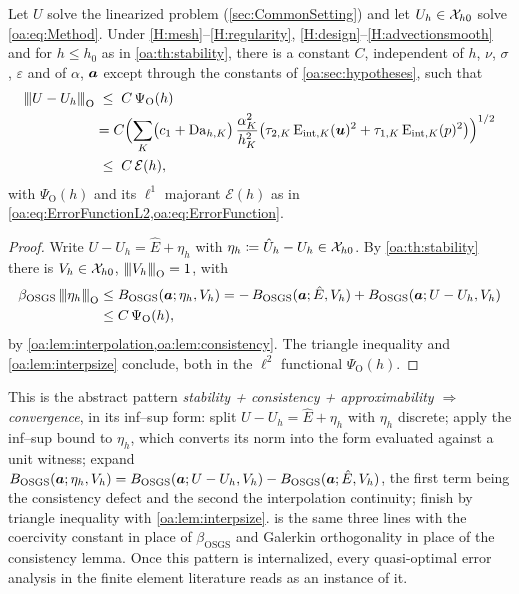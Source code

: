 \begin{theorem}
\label{oa:th:convergence}
Let $U$ solve the linearized problem (\cref{sec:CommonSetting}) and let
$U_h \in \mathcal{X}_{h0}$ solve \cref{oa:eq:Method}. Under \cref{H:mesh}--\cref{H:regularity}, \cref{H:design}--\cref{H:advectionsmooth} and for
$h \le h_0$ as in \cref{oa:th:stability}, there is a constant $C$, independent of $h$,
$\nu$, $\sigma$, $\varepsilon$ and of $\alpha$, $\boldsymbol{a}$ except through the constants of
\cref{oa:sec:hypotheses}, such that
\begin{equation}
  \label{oa:eq:MainResult}
\begin{aligned}
  {\lvert\kern-0.25ex\lvert\kern-0.25ex\lvert U - U_h \rvert\kern-0.25ex\rvert\kern-0.25ex\rvert}_{\mathrm{O}}
  &\;\le\;
  C\,\Psi_{\mathrm O}(h) \\
  &= C\Bigl( \sum_K \bigl( c_1 + \mathrm{Da}_{h,K} \bigr)\,\frac{\alpha_K^2}{h_K^2}
  \bigl( \tau_{2,K}\,\mathrm{E}_{\mathrm{int},K}(\boldsymbol{u})^2 + \tau_{1,K}\,\mathrm{E}_{\mathrm{int},K}(p)^2 \bigr) \Bigr)^{1/2} \\
  &\;\le\; C\,\mathcal{E}(h),
\end{aligned}
\end{equation}
with $\Psi_{\mathrm O}(h)$ and its $\ell^1$ majorant $\mathcal{E}(h)$ as in
\cref{oa:eq:ErrorFunctionL2,oa:eq:ErrorFunction}.
\end{theorem}

\begin{proof}
Write $U - U_h = \hat E + \eta_h$ with $\eta_h \coloneqq \hat U_h - U_h \in \mathcal{X}_{h0}$.
By \cref{oa:th:stability} there is $V_h \in \mathcal{X}_{h0}$, ${\lvert\kern-0.25ex\lvert\kern-0.25ex\lvert V_h \rvert\kern-0.25ex\rvert\kern-0.25ex\rvert}_{\mathrm{O}} = 1$, with
\[
\begin{aligned}
  \beta_{\mathrm{OSGS}}\,{\lvert\kern-0.25ex\lvert\kern-0.25ex\lvert \eta_h \rvert\kern-0.25ex\rvert\kern-0.25ex\rvert}_{\mathrm{O}}
  &\le B_{\mathrm{OSGS}}(\boldsymbol{a}; \eta_h, V_h)
  = -\,B_{\mathrm{OSGS}}(\boldsymbol{a}; \hat E, V_h)
  + B_{\mathrm{OSGS}}(\boldsymbol{a}; U - U_h, V_h) \\
  &\le C\,\Psi_{\mathrm O}(h),
\end{aligned}
\]
by \cref{oa:lem:interpolation,oa:lem:consistency}. The triangle inequality and
\cref{oa:lem:interpsize} conclude, both in the $\ell^2$ functional $\Psi_{\mathrm O}(h)$.
\end{proof}

\begin{pedagogy}
This is the abstract pattern \emph{stability + consistency + approximability
$\Rightarrow$ convergence}, in its inf--sup form: split $U - U_h = \hat E +
\eta_h$ with $\eta_h$ discrete; apply the inf--sup bound to $\eta_h$, which
converts its norm into the form evaluated against a unit witness; expand
$B_{\mathrm{OSGS}}(\boldsymbol{a};\eta_h, V_h) = B_{\mathrm{OSGS}}(\boldsymbol{a};U-U_h, V_h) -
B_{\mathrm{OSGS}}(\boldsymbol{a};\hat E, V_h)$, the first term being the consistency defect
and the second the interpolation continuity; finish by triangle inequality with
\cref{oa:lem:interpsize}.  is the same three lines with
the coercivity constant in place of $\beta_{\mathrm{OSGS}}$ and Galerkin
orthogonality in place of the consistency lemma. Once this pattern is
internalized, every quasi-optimal error analysis in the finite element
literature reads as an instance of it.
\end{pedagogy}


